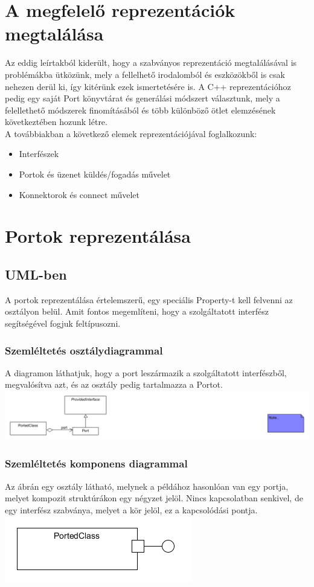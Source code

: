 \documentclass[a4paper,12pt]{report}
\begin{document}
\section{A megfelelő reprezentációk megtalálása}
Az eddig leírtakból kiderült, hogy a szabványos reprezentáció megtalálásával is problémákba ütközünk, mely a fellelhető irodalomból és eszközökből is csak nehezen derül ki, így kitérünk ezek ismertetésére is. A C++ reprezentációhoz pedig egy saját Port könyvtárat és generálási módszert választunk, mely a felellethető módszerek finomításából és több különböző ötlet elemzésének következtében hozunk létre. \\

A továbbiakban a következő elemek reprezentációjával foglalkozunk:
\begin{itemize}
\item Interfészek
\item Portok és üzenet küldés/fogadás művelet
\item Konnektorok és connect művelet
\end{itemize}

\section{Portok reprezentálása}

\subsection{UML-ben}
A portok reprezentálása értelemszerű, egy speciális Property-t kell felvenni az osztályon belül. Amit fontos megemlíteni, hogy a szolgáltatott interfész segítségével fogjuk feltípusozni. 


\subsubsection{Szemléltetés osztálydiagrammal}
A diagramon láthatjuk, hogy a port leszármazik a szolgáltatott interfészből, megvalósítva azt, és az osztály pedig tartalmazza a Portot.
\includegraphics[scale=0.8]{uml_port_class.png}

\subsubsection{Szemléltetés komponens diagrammal}
Az ábrán egy osztály látható, melynek a példához hasonlóan van egy portja, melyet kompozit struktúrákon egy négyzet jelöl. Nincs kapcsolatban senkivel, de egy interfész szabványa, melyet a kör jelöl, ez a kapcsolódási pontja.
\includegraphics[scale=0.7]{uml_port_comp.png}
\end{document}
